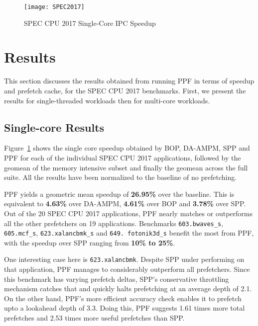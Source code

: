 \begin{figure}[ht]
\texttt{[image: SPEC2017]}
\caption{SPEC CPU 2017 Single-Core IPC Speedup}
\label{Fig:SPEC2017_1core}
\end{figure}

\section{Results}
\label{Results}

This section discusses the results obtained from running PPF in terms
of speedup and prefetch cache, for the SPEC CPU 2017 benchmarks.
First, we present the results for single-threaded workloads then for
multi-core workloads.

\subsection{Single-core Results}
\label{Results-Single}


Figure~\ref{Fig:SPEC2017_1core} shows the single core speedup obtained
by BOP, DA-AMPM, SPP and PPF for each of the individual SPEC CPU 2017
applications, followed by the geomean of the memory intensive subset
and finally the geomean across the full suite.  All the results have
been normalized to the baseline of no prefetching.


PPF yields a geometric mean speedup of \textbf{26.95\%} over the
baseline.  This is equivalent to \textbf{4.63\%} over DA-AMPM,
\textbf{4.61\%} over BOP and \textbf{3.78\%} over SPP.  Out of the 20
SPEC CPU 2017 applications, PPF nearly matches or
outperforms all the other prefetchers on 19 applications.  
Benchmarks {\tt 603.bwaves\_s}, {\tt 605.mcf\_s}, {\tt{623.xalancbmk}\_s} 
and {\tt 649. fotonik3d\_s} benefit the most from PPF, with the 
speedup over SPP ranging from \textbf{10\% to 25\%}.

One interesting
case here is {\tt 623.xalancbmk}.  Despite SPP under performing on that
application, PPF manages to considerably outperform all prefetchers.
Since this benchmark has varying prefetch deltas, SPP's conservative
throttling mechanism catches that and quickly halts prefetching at an
average depth of 2.1.  On the other hand, PPF's more efficient
accuracy check enables it to prefetch upto a lookahead depth of
3.3. Doing this, PPF suggests 1.61 times more total prefetches and
2.53 times more useful prefetches than SPP.

